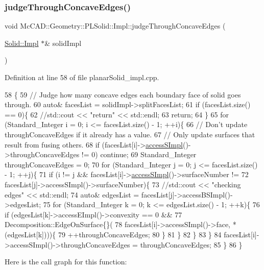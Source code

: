 \subsubsection{\texorpdfstring{judge\+Through\+Concave\+Edges()}{judgeThroughConcaveEdges()}\hspace{0.1cm}{\footnotesize\ttfamily [2/2]}}
{\footnotesize\ttfamily void Mc\+C\+A\+D\+::\+Geometry\+::\+P\+L\+Solid\+::\+Impl\+::judge\+Through\+Concave\+Edges (\begin{DoxyParamCaption}\item[{\hyperlink{classMcCAD_1_1Geometry_1_1Solid_1_1Impl}{Solid\+::\+Impl} $\ast$\&}]{solid\+Impl }\end{DoxyParamCaption})}



Definition at line 58 of file planar\+Solid\+\_\+impl.\+cpp.


\begin{DoxyCode}
58                                                                        \{
59     \textcolor{comment}{// Judge how many concave edges each boundary face of solid goes through.}
60     \textcolor{keyword}{auto}& facesList = solidImpl->splitFacesList;
61     \textcolor{keywordflow}{if} (facesList.size() == 0)\{
62         \textcolor{comment}{//std::cout << "return" << std::endl;}
63         \textcolor{keywordflow}{return};
64     \}
65     \textcolor{keywordflow}{for} (Standard\_Integer i = 0; i <= facesList.size() - 1; ++i)\{
66         \textcolor{comment}{// Don't update throughConcaveEdges if it already has a value.}
67         \textcolor{comment}{// Only update surfaces that result from fusing others.}
68         \textcolor{keywordflow}{if} (facesList[i]->\hyperlink{classMcCAD_1_1Geometry_1_1Solid_a41304db7cdf4762342ea833b15764180}{accessSImpl}()->throughConcaveEdges != 0) \textcolor{keywordflow}{continue};
69         Standard\_Integer throughConcaveEdges = 0;
70         \textcolor{keywordflow}{for} (Standard\_Integer j = 0; j <= facesList.size() - 1; ++j)\{
71             \textcolor{keywordflow}{if} (i != j && facesList[i]->\hyperlink{classMcCAD_1_1Geometry_1_1Solid_a41304db7cdf4762342ea833b15764180}{accessSImpl}()->surfaceNumber !=
72                     facesList[j]->accessSImpl()->surfaceNumber)\{
73                 \textcolor{comment}{//std::cout << "checking edges" << std::endl;}
74                 \textcolor{keyword}{auto}& edgesList = facesList[j]->accessBSImpl()->edgesList;
75                 \textcolor{keywordflow}{for} (Standard\_Integer k = 0; k <= edgesList.size() - 1; ++k)\{
76                     \textcolor{keywordflow}{if} (edgesList[k]->accessEImpl()->convexity == 0 &&
77                             Decomposition::EdgeOnSurface\{\}(
78                                 facesList[i]->accessSImpl()->face, *(edgesList[k])))\{
79                         ++throughConcaveEdges;
80                     \}
81                 \}
82             \}
83         \}
84         facesList[i]->accessSImpl()->throughConcaveEdges = throughConcaveEdges;
85     \}
86 \}
\end{DoxyCode}
Here is the call graph for this function\+:


